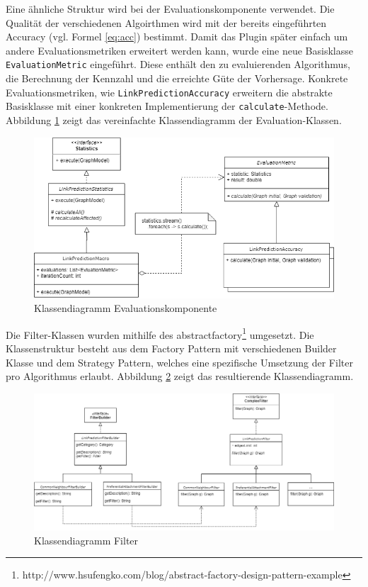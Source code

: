 Eine ähnliche Struktur wird bei der Evaluationskomponente verwendet.
Die Qualität der verschiedenen Algoirthmen wird mit der bereits eingeführten Accuracy (vgl. Formel \ref{eq:acc}) bestimmt.
Damit das Plugin später einfach um andere Evaluationsmetriken erweitert werden kann, wurde eine neue Basisklasse \texttt{EvaluationMetric} eingeführt.
Diese enthält den zu evaluierenden Algorithmus, die Berechnung der Kennzahl und die erreichte Güte der Vorhersage. Konkrete Evaluationsmetriken, wie \texttt{LinkPredictionAccuracy} erweitern die abstrakte Basisklasse mit einer konkreten Implementierung der \texttt{calculate}-Methode.
Abbildung \ref{fig:class_eval} zeigt das vereinfachte Klassendiagramm der Evaluation-Klassen.
\begin{figure}
    \centering
    \includegraphics[width=\linewidth]{resources/class_Evaluation.png}
    \caption{Klassendiagramm Evaluationskomponente}
    \label{fig:class_eval}
\end{figure}

Die Filter-Klassen wurden mithilfe des \acs{abstractfactory}\footnote{http://www.hsufengko.com/blog/abstract-factory-design-pattern-example} umgesetzt. Die Klassenstruktur besteht aus dem Factory Pattern mit verschiedenen Builder Klasse und dem Strategy Pattern, welches eine spezifische Umsetzung der Filter pro Algorithmus erlaubt. Abbildung \ref{fig:class_filter} zeigt das resultierende Klassendiagramm.
\begin{figure}
    \centering
    \includegraphics[width=\linewidth]{resources/class_Filter.png}
    \caption{Klassendiagramm Filter}
    \label{fig:class_filter}
\end{figure}

